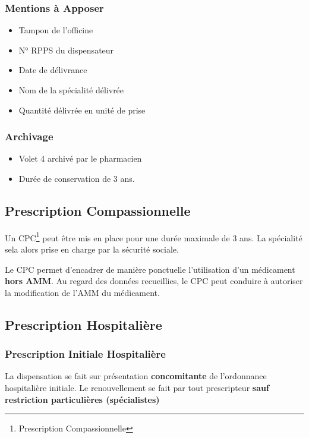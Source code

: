 \documentclass[11pt]{article}
\begin{document}
\subsubsection{Mentions à Apposer}
\label{sec:orga2de9b8}
\begin{itemize}
\item Tampon de l'officine
\item N° RPPS du dispensateur
\item Date de délivrance
\item Nom de la spécialité délivrée
\item Quantité délivrée en unité de prise
\end{itemize}


\subsubsection{Archivage}
\label{sec:orga04c9b8}
\begin{itemize}
\item Volet 4 archivé par le pharmacien
\item Durée de conservation de 3 ans.
\end{itemize}

\subsection{Prescription Compassionnelle}
\label{sec:org723f4af}
Un CPC\footnote{Prescription Compassionnelle} peut être mis en place pour une durée maximale de 3 ans.
La spécialité sela alors prise en charge par la sécurité sociale.

Le CPC permet d'encadrer de manière ponctuelle l'utilisation d'un médicament \textbf{hors AMM}.
Au regard des données recueillies, le CPC peut conduire à autoriser la modification de l'AMM du médicament.

\subsection{Prescription Hospitalière}
\label{sec:orgd43c514}

\subsubsection{Prescription Initiale Hospitalière}
\label{sec:org9db7f66}
La dispensation se fait sur présentation \textbf{concomitante} de l'ordonnance hospitalière initiale.
Le renouvellement se fait par tout prescripteur \textbf{sauf restriction particulières (spécialistes)}
\end{document}
